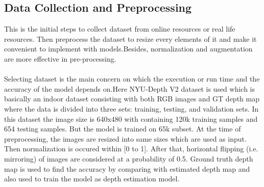 \documentclass[a4paper,12pt,oneside]{book}
\begin{document}
\subsection{Data Collection and Preprocessing}\label{sec:sec_1}
This is the initial steps to collect dataset from online resources or real life resources. Then preprocess the dataset to resize every elements of it and make it convenient to implement with models.Besides, normalization and augmentation are more effective in pre-processing.\\\\
Selecting dataset is the main concern on which the execution or run time and the accuracy of the model depends on.Here NYU-Depth V2 \cite{laina2016deeper} dataset is used which is basically an indoor dataset consisting with both RGB images and GT depth map where the data is divided into three sets: training, testing, and validation sets. In this dataset the image size is 640x480 with containing 120k training samples and 654 testing samples. But the model is trained on 65k subset. At the time of preprocessing, the images are resized into same sizes which are used as input. Then normalization is occured within [0 to 1]. After that, horizontal flipping (i.e. mirroring) of images are considered at a probability of 0.5.
Ground truth depth map is used to find the accuracy by comparing with estimated depth map and also used to train the model as depth estimation model.
\end{document}
